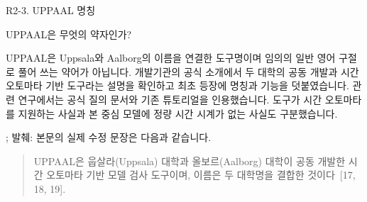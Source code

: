 \begin{reviewitem}{R2-3. UPPAAL 명칭}

\begin{reviewercomment}

UPPAAL은 무엇의 약자인가?

\end{reviewercomment}

\begin{authorresponse}

UPPAAL은 Uppsala와 Aalborg의 이름을 연결한 도구명이며 임의의 일반 영어 구절로 풀어 쓰는 약어가 아닙니다. 개발기관의 공식 소개에서 두 대학의 공동 개발과 시간 오토마타 기반 도구라는 설명을 확인하고 최초 등장에 명칭과 기능을 덧붙였습니다. 관련 연구에서는 공식 질의 문서와 기존 튜토리얼을 인용했습니다. 도구가 시간 오토마타를 지원하는 사실과 본 중심 모델에 정량 시간 시계가 없는 사실도 구분했습니다.

\end{authorresponse}

\begin{manuscriptrevision}{; 발췌: }
본문의 실제 수정 문장은 다음과 같습니다.

\begin{quote}
UPPAAL은 웁살라(Uppsala) 대학과 올보르(Aalborg) 대학이 공동 개발한 시간 오토마타 기반 모델 검사 도구이며, 이름은 두 대학명을 결합한 것이다~[17, 18, 19].
\end{quote}
\end{manuscriptrevision}

\end{reviewitem}

\clearpage

